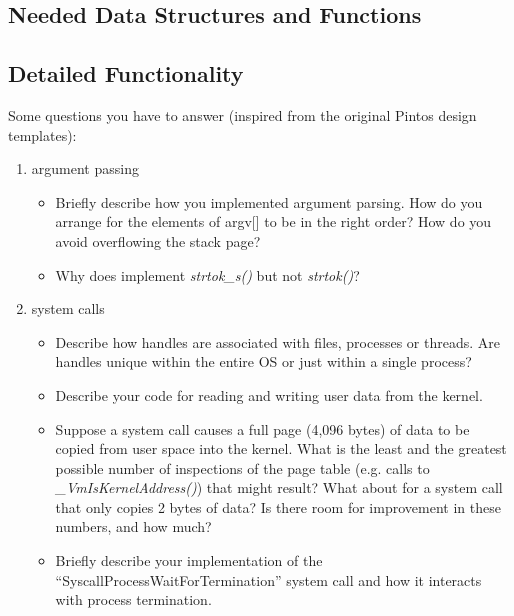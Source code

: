 \subsection{Needed Data Structures and Functions}



\subsection{Detailed Functionality}


Some questions you have to answer (inspired from the original Pintos design templates):
\begin{enumerate}
    \item argument passing
        \begin{itemize}
            \item Briefly describe how you implemented argument parsing.  How do you arrange for the elements of argv[] to be in the right order? How do you avoid overflowing the stack page?
            
            \item Why does \OSName{} implement \textit{strtok\_s()} but not \textit{strtok()}?
            
        \end{itemize}

        \item system calls
            \begin{itemize}
                \item Describe how handles are associated with files, processes or threads. Are handles unique within the entire OS or just within a single process?
                
                \item Describe your code for reading and writing user data from the kernel.
                
                \item Suppose a system call causes a full page (4,096 bytes) of data to be copied from user space into the kernel. What is the least and the greatest possible number of inspections of the page table (e.g. calls to \textit{\_VmIsKernelAddress()}) that might result? What about for a system call that only copies 2 bytes of data? Is there room for improvement in these numbers, and how much?
                
                \item Briefly describe your implementation of the ``SyscallProcessWaitForTermination'' system call and how it interacts with process termination.
                

\end{itemize}
\end{enumerate}

